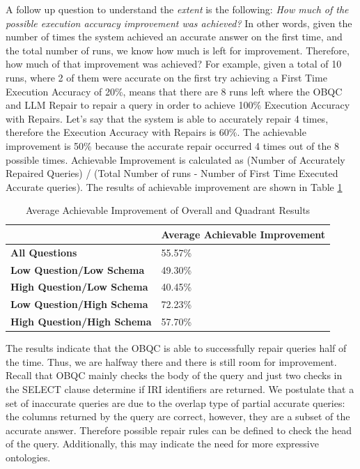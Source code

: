 \documentclass[11pt]{article}
\begin{document}

A follow up question to understand the \textit{extent} is the following: 
\textit{How much of the possible execution accuracy improvement was achieved?}
In other words, given the number of times the system achieved an accurate answer on the first time, and the total number of runs, we know how much is left for improvement. Therefore, how much of that improvement was achieved? 
For example, given a total of 10 runs, where 2 of them were accurate on the first try achieving a First Time Execution Accuracy of 20\%, means that there are 8 runs left where the OBQC and LLM Repair to repair a query in order to achieve 100\% Execution Accuracy with Repairs. Let's say that the system is able to accurately repair 4 times, therefore the Execution Accuracy with Repairs is 60\%. 
The achievable improvement is 50\% because the accurate repair occurred 4 times out of the 8 possible times. 
Achievable Improvement is calculated as (Number of Accurately Repaired Queries) / (Total Number of runs - Number of First Time Executed Accurate queries).
The results of achievable improvement are shown in Table \ref{table:AchievableImprovementResults}

\begin{table}
\centering
\begin{tabular}{ | m{5cm} | m{3cm} |} 
\hline
  & \textbf{Average Achievable Improvement}\\ 
  \hline
  \textbf{All Questions}   & 55.57\% \\ 
  \hline
  \textbf{Low Question/Low Schema}& 49.30\% \\ 
  \hline
  \textbf{High Question/Low Schema}& 40.45\% \\ 
  \hline
  \textbf{Low Question/High Schema}& 72.23\% \\  
  \hline
  \textbf{High Question/High Schema}& 57.70\% \\ 
  \hline
\end{tabular}
\caption{Average Achievable Improvement of Overall and Quadrant Results}
\label{table:AchievableImprovementResults}
\end{table}

The results indicate that the OBQC is able to successfully repair queries half of the time. 
Thus, we are halfway there and there is still room for improvement. 
Recall that OBQC mainly checks the body of the query and just two checks in the SELECT clause determine if IRI identifiers are returned. 
We postulate that a set of inaccurate queries are due to the overlap type of partial accurate queries: the columns returned by the query are correct, however, they are a subset of the accurate answer.
Therefore possible repair rules can be defined to check the head of the query.
Additionally, this may indicate the need for more expressive ontologies. 
\end{document}
